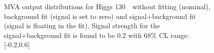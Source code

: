 \begin{figure}[!hbtp]
\caption{
MVA output distributions for Higgs 130~\GeV\ without fitting
(nominal), background fit (signal is set to zero) and
signal+background fit (signal is floating in the fit). Signal strength
for the signal+background fit is found to be 0.2 with 68\% CL range:
[-0.2,0.6]  }
\label{fig:fit_130}
\end{figure}

